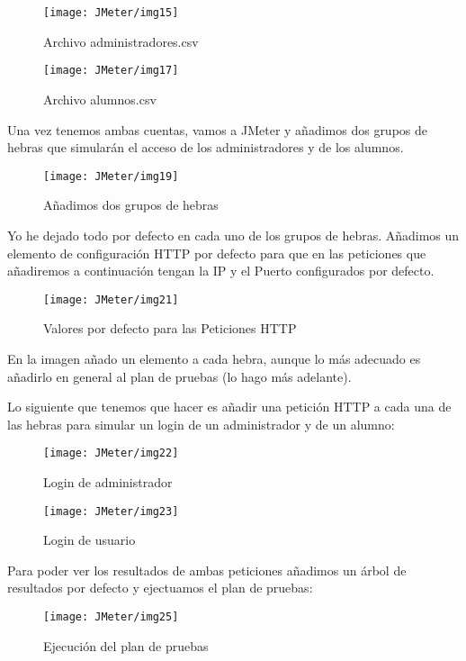 \begin{figure}[H]
    \centering
    \texttt{[image: JMeter/img15]}
    \caption{Archivo administradores.csv}
\end{figure}

\begin{figure}[H]
    \centering
    \texttt{[image: JMeter/img17]}
    \caption{Archivo alumnos.csv}
\end{figure}

Una vez tenemos ambas cuentas, vamos a JMeter y añadimos dos grupos de hebras que simularán el acceso de los administradores y de los alumnos.

\begin{figure}[H]
    \centering
    \texttt{[image: JMeter/img19]}
    \caption{Añadimos dos grupos de hebras}
\end{figure}

Yo he dejado todo por defecto en cada uno de los grupos de hebras. Añadimos un elemento de configuración HTTP por defecto para que en las peticiones que añadiremos a continuación tengan la IP y el Puerto configurados por defecto.

\begin{figure}[H]
    \centering
    \texttt{[image: JMeter/img21]}
    \caption{Valores por defecto para las Peticiones HTTP}
\end{figure}

En la imagen añado un elemento a cada hebra, aunque lo más adecuado es añadirlo en general al plan de pruebas (lo hago más adelante).

Lo siguiente que tenemos que hacer es añadir una petición HTTP a cada una de las hebras para simular un login de un administrador y de un alumno:

\begin{figure}[H]
    \centering
    \texttt{[image: JMeter/img22]}
    \caption{Login de administrador}
\end{figure}

\begin{figure}[H]
    \centering
    \texttt{[image: JMeter/img23]}
    \caption{Login de usuario}
\end{figure}

Para poder ver los resultados de ambas peticiones añadimos un árbol de resultados por defecto y ejectuamos el plan de pruebas:

\begin{figure}[H]
    \centering
    \texttt{[image: JMeter/img25]}
    \caption{Ejecución del plan de pruebas}
\end{figure}

